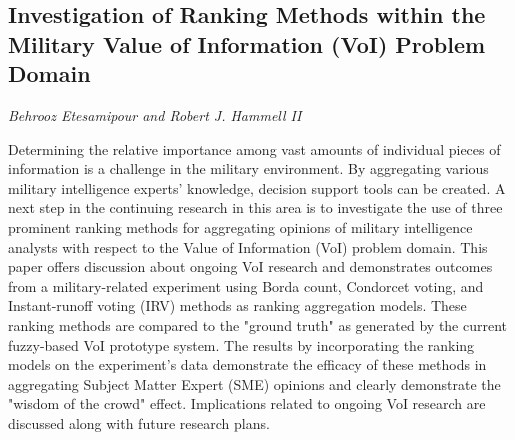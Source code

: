 \documentclass[../booklet.tex]{subfiles}
\begin{document}
\subsection[Investigation of Ranking Methods within the Military Value of Information (VoI) Problem Domain. {\it Behrooz Etesamipour and Robert J. Hammell II}]{Investigation of Ranking Methods within the Military Value of Information (VoI) Problem Domain}
 

\begin{center}
  {\it Behrooz Etesamipour and Robert J. Hammell II}
\end{center}

\vskip 0.8cm

Determining the relative importance among vast amounts of individual pieces of information is a challenge in the military environment. By aggregating various military intelligence experts' knowledge, decision support tools can be created. A next step in the continuing research in this area is to investigate the use of three prominent ranking methods for aggregating opinions of military intelligence analysts with respect to the Value of Information (VoI) problem domain. This paper offers discussion about ongoing VoI research and demonstrates outcomes from a military-related experiment using Borda count, Condorcet voting, and Instant-runoff voting (IRV) methods as ranking aggregation models. These ranking methods are compared to the "ground truth" as generated by the current fuzzy-based VoI prototype system. The results by incorporating the ranking models on the experiment's data demonstrate the efficacy of these methods in aggregating Subject Matter Expert (SME) opinions and clearly demonstrate the "wisdom of the crowd" effect. Implications related to ongoing VoI research are discussed along with future research plans.
\end{document}
